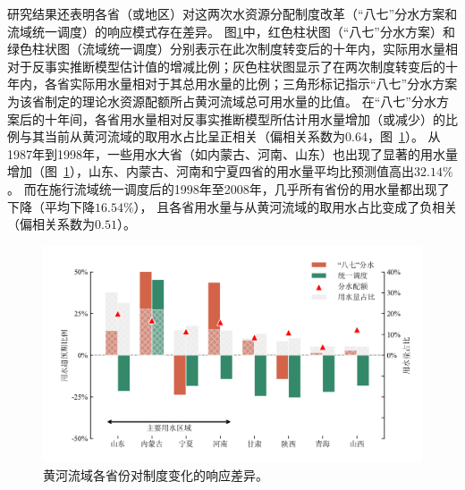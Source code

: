研究结果还表明各省（或地区）对这两次水资源分配制度改革（“八七”分水方案和流域统一调度）的响应模式存在差异。
图\ref{fig:regulating}中，红色柱状图（“八七”分水方案）和绿色柱状图（流域统一调度）分别表示在此次制度转变后的十年内，实际用水量相对于反事实推断模型估计值的增减比例；灰色柱状图显示了在两次制度转变后的十年内，各省实际用水量相对于其总用水量的比例；三角形标记指示“八七”分水方案为该省制定的理论水资源配额所占黄河流域总可用水量的比值。
在“八七”分水方案后的十年间，各省用水量相对反事实推断模型所估计用水量增加（或减少）的比例与其当前从黄河流域的取用水占比呈正相关（偏相关系数为$0.64$，图~\ref{fig:regulating}）。
从1987年到1998年，一些用水大省（如内蒙古、河南、山东）也出现了显著的用水量增加（图~\ref{fig:regulating}），山东、内蒙古、河南和宁夏四省的用水量平均比预测值高出$32.14\%$。
而在施行流域统一调度后的1998年至2008年，几乎所有省份的用水量都出现了下降（平均下降$16.54\%$），
且各省用水量与从黄河流域的取用水占比变成了负相关（偏相关系数为$0.51$）。

\begin{figure}[!htb]
	\includegraphics[width=\textwidth]{img/ch5/fig3.png}
	\caption[黄河流域各省份对制度变化的响应差异]{黄河流域各省份对制度变化的响应差异。}\label{fig:regulating}
\end{figure}
